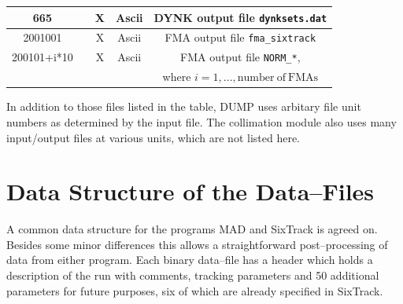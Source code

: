 \documentclass[a4paper,11pt]{report}
\begin{document}
\begin{center}
\begin{longtable}{|c|c|c|c|c|}
  \hline \rule[-3.75mm]{0mm}{10mm}
  665 & & X & Ascii & DYNK output file \texttt{dynksets.dat} \\
  \hline \rule[-3.75mm]{0mm}{10mm}
  2001001 & & X & Ascii & FMA output file \texttt{fma\_sixtrack} \\\hline \rule[-3.75mm]{0mm}{10mm}
  200101+i*10 & & X & Ascii & FMA output file \texttt{NORM\_*}, \\*
  \rule[-3.7mm]{0mm}{7.5mm}
  & & & & where $i=1,\ldots,\mathrm{number \ of \ FMAs}$ \\\hline
\end{longtable}
\end{center}


In addition to those files listed in the table, DUMP uses arbitary file unit numbers as determined by the input file. The collimation module also uses many input/output files at various units, which are not listed here.

\chapter{Data Structure of the Data--Files} \label{Header}

A common data structure for the programs MAD and SixTrack is agreed
on. Besides some minor differences this allows a straightforward
post--processing of data from either program. Each binary data--file
has a header which holds a description of the run with comments,
tracking parameters and 50 additional parameters for future purposes,
six of which are already specified in SixTrack\@.
\end{document}

